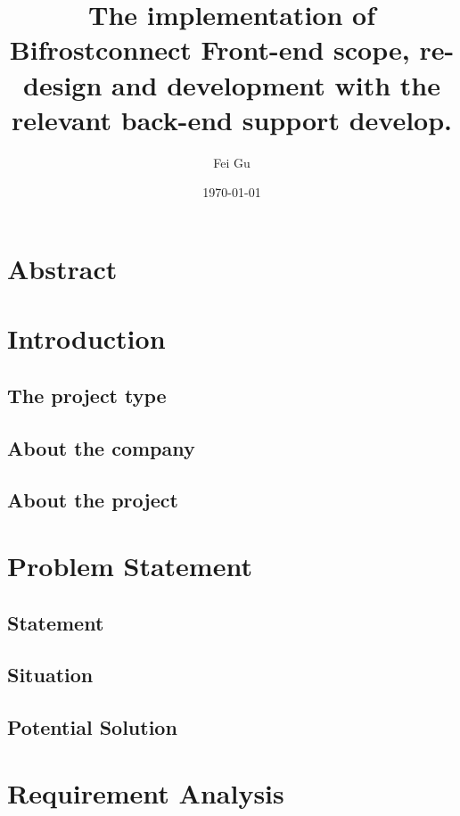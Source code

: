 \documentclass{article}
\title{The implementation of Bifrostconnect Front-end scope, re-design and
development with the relevant back-end support develop.}
\author{Fei Gu}
\date{\today}
\begin{document}
\maketitle
\section*{Abstract}
\pagebreak

\tableofcontents
\pagebreak

\section{Introduction}
    \subsection{The project type}
    
    \subsection{About the company}
    
    \subsection{About the project}
    
\pagebreak

\section{Problem Statement}
        \subsection{Statement}
        
        \subsection{Situation}
        
        \subsection{Potential Solution}
        
\pagebreak

\section{Requirement Analysis}

\end{document}
